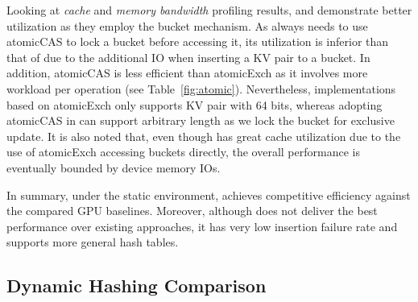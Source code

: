 Looking at \emph{cache} and \emph{memory bandwidth} profiling results, \megakv and \voter demonstrate better utilization as they employ the bucket mechanism.
As \voter always needs to use atomicCAS to lock a bucket before accessing it, its utilization is inferior than that of \megakv due to the additional IO when inserting a KV pair to a bucket. In addition, atomicCAS is less efficient than atomicExch as it involves more workload per operation (see Table~\ref{fig:atomic}). Nevertheless, implementations based on atomicExch only supports KV pair with 64 bits, whereas adopting atomicCAS in \voter can support arbitrary length as we lock the bucket for exclusive update.
It is also noted that, even though \megakv has great cache utilization due to the use of atomicExch accessing buckets directly, the overall performance is eventually bounded by device memory IOs. 

In summary, under the static environment, \voter achieves competitive efficiency against the compared GPU baselines. Moreover, although \voter does not deliver the best performance over existing approaches, it has very low insertion failure rate and supports more general hash tables.






\subsection{Dynamic Hashing Comparison}\label{sec:exp:dynamic}

